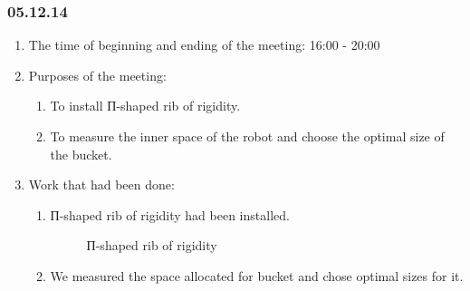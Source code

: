 \subsubsection{05.12.14}

\begin{enumerate}
	\item The time of beginning and ending of the meeting:
	16:00 - 20:00
	\item Purposes of the meeting:
	\begin{enumerate}
		\item To install П-shaped rib of rigidity.
		
		\item To measure the inner space of the robot and choose the optimal size of the bucket.
		
	\end{enumerate}
	\item Work that had been done:
	\begin{enumerate}
		\item П-shaped rib of rigidity had been installed.
		
		\begin{figure}[H]
			\begin{minipage}[h]{0.2\linewidth}
				\center  
			\end{minipage}
			\begin{minipage}[h]{0.6\linewidth}
				\caption{П-shaped rib of rigidity}
			\end{minipage}
		\end{figure}
		
		\item We measured the space allocated for bucket and chose optimal sizes for it.
		

\end{enumerate}
\end{enumerate}
